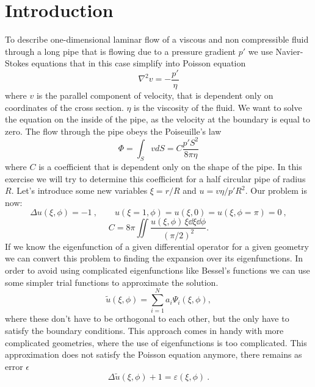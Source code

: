 \documentclass[12pt, a4paper]{article}
\begin{document}
\section{Introduction}
To describe one-dimensional laminar flow of a viscous and non compressible fluid through a long pipe that is flowing due to a pressure gradient $p'$ we use Navier-Stokes equations that in this case simplify into Poisson equation
\begin{equation*}
  \nabla^2 v = -\frac{p'}{\eta}
\end{equation*}
where $v$ is the parallel component of velocity, that is dependent only on coordinates of the cross section. $\eta$ is the viscosity of the fluid. We want to solve the equation on the inside of the pipe, as the velocity at the boundary is equal to zero. The flow through the pipe obeys the Poiseuille's law
\begin{equation*}
  \Phi = \int_S vdS = C\frac{p'S^2}{8\pi\eta}
\end{equation*}
where $C$ is a coefficient that is dependent only on the shape of the pipe. In this exercise we will try to determine this coefficient for a half circular pipe of radius $R$. Let's introduce some new variables $\xi = r/R$ and $u = v\eta/p'R^2$. Our problem is now:
\begin{equation*}
  \Delta u(\xi,\phi) = -1 \>,\qquad
  u(\xi=1,\phi)=u(\xi,0)=u(\xi,\phi=\pi)=0 \>,
\end{equation*}
\begin{equation*}
  C = 8\pi \iint \frac{u(\xi,\phi)\,\xi\dd \xi \dd\phi}{ (\pi/2)^2}.
\end{equation*}
If we know the eigenfunction of a given differential operator for a given geometry we can convert this problem to finding the expansion over its eigenfunctions. In order to avoid using complicated eigenfunctions like Bessel's functions we can use some simpler trial functions to approximate the solution. 
\begin{equation*}
  \tilde{u}(\xi,\phi) = \sum\limits_{i=1}^N  a_i \Psi_i(\xi,\phi),
  \label{eq:trials}
\end{equation*}
where these don't have to be orthogonal to each other, but the only have to satisfy the boundary conditions. This approach comes in handy with more complicated geometries, where the use of eigenfunctions is too complicated. This approximation does not satisfy the Poisson equation anymore, there remains as error $\epsilon$
\begin{equation*}
  \Delta \tilde{u}(\xi,\phi) + 1 = \varepsilon(\xi,\phi) \>.
\end{equation*}
\end{document}
